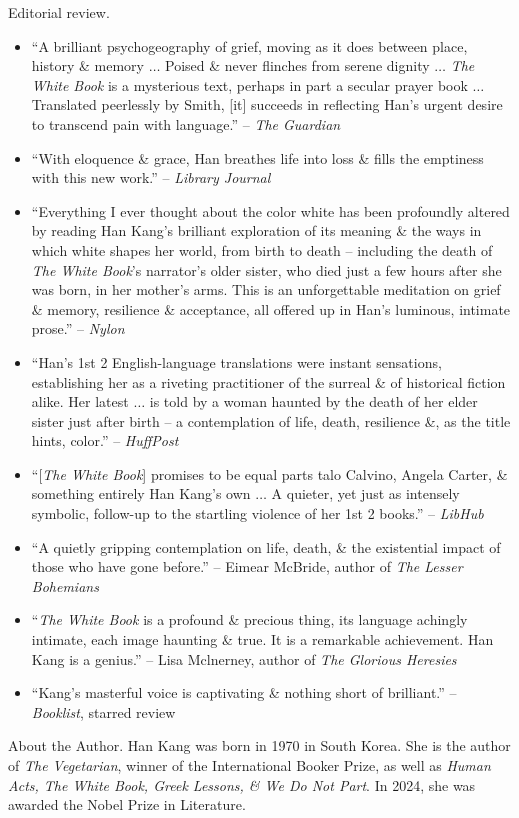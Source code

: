 \documentclass{article}
\begin{document}
\begin{enumerate}
	{\sf Editorial review.}
	\begin{itemize}
		\item ``A brilliant psychogeography of grief, moving as it does between place, history \& memory $\ldots$ Poised \& never flinches from serene dignity $\ldots$ {\it The White Book} is a mysterious text, perhaps in part a secular prayer book $\ldots$ Translated peerlessly by {\sc Smith}, [it] succeeds in reflecting {\sc Han}'s urgent desire to transcend pain with language.'' -- {\it The Guardian}
		\item ``With eloquence \& grace, {\sc Han} breathes life into loss \& fills the emptiness with this new work.'' -- {\it Library Journal}
		\item ``Everything I ever thought about the color white has been profoundly altered by reading {\sc Han Kang}'s brilliant exploration of its meaning \& the ways in which white shapes her world, from birth to death -- including the death of {\it The White Book}'s narrator's older sister, who died just a few hours after she was born, in her mother's arms. This is an unforgettable meditation on grief \& memory, resilience \& acceptance, all offered up in {\sc Han}'s luminous, intimate prose.'' -- {\it Nylon}
		\item ``{\sc Han}'s 1st 2 English-language translations were instant sensations, establishing her as a riveting practitioner of the surreal \& of historical fiction alike. Her latest $\ldots$ is told by a woman haunted by the death of her elder sister just after birth -- a contemplation of life, death, resilience \&, as the title hints, color.'' -- {\it HuffPost}
		\item ``[{\it The White Book}] promises to be equal parts {\sc talo Calvino, Angela Carter}, \& something entirely {\sc Han Kang}'s own $\ldots$ A quieter, yet just as intensely symbolic, follow-up to the startling violence of her 1st 2 books.'' -- {\it LibHub}
		\item ``A quietly gripping contemplation on life, death, \& the existential impact of those who have gone before.'' -- {\sc Eimear McBride}, author of {\it The Lesser Bohemians}
		\item ``{\it The White Book} is a profound \& precious thing, its language achingly intimate, each image haunting \& true. It is a remarkable achievement. {\sc Han Kang} is a genius.'' -- {\sc Lisa Mclnerney}, author of {\it The Glorious Heresies}
		\item ``{\sc Kang}'s masterful voice is captivating \& nothing short of brilliant.'' -- {\it Booklist}, starred review
	\end{itemize}
	{\sf About the Author.} {\sc Han Kang} was born in 1970 in South Korea. She is the author of {\it The Vegetarian}, winner of the International Booker Prize, as well as {\it Human Acts, The White Book, Greek Lessons, \& We Do Not Part}. In 2024, she was awarded the Nobel Prize in Literature.
	

\end{enumerate}
\end{document}
